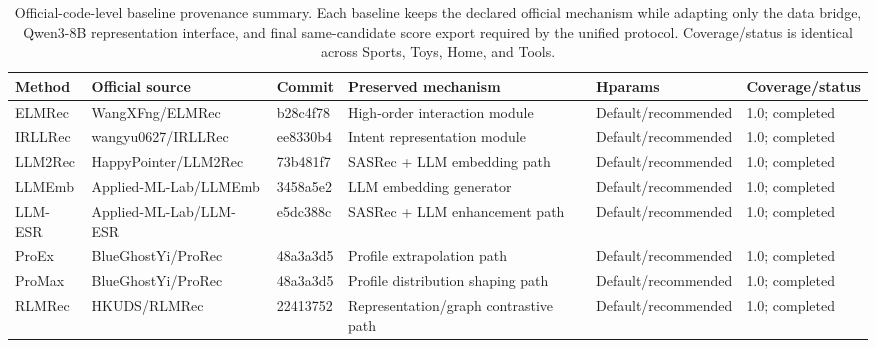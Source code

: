 \begin{table}[t]
\centering
\scriptsize
\setlength{\tabcolsep}{3pt}
\caption{Official-code-level baseline provenance summary. Each baseline keeps
the declared official mechanism while adapting only the data bridge, Qwen3-8B
representation interface, and final same-candidate score export required by
the unified protocol. Coverage/status is identical across Sports, Toys, Home,
and Tools.}
\label{tab:baseline_provenance}
\begin{tabular}{llllll}
\toprule
Method & Official source & Commit & Preserved mechanism & Hparams & Coverage/status \\
\midrule
ELMRec & WangXFng/ELMRec & b28c4f78 & High-order interaction module & Default/recommended & 1.0; completed \\
IRLLRec & wangyu0627/IRLLRec & ee8330b4 & Intent representation module & Default/recommended & 1.0; completed \\
LLM2Rec & HappyPointer/LLM2Rec & 73b481f7 & SASRec + LLM embedding path & Default/recommended & 1.0; completed \\
LLMEmb & Applied-ML-Lab/LLMEmb & 3458a5e2 & LLM embedding generator & Default/recommended & 1.0; completed \\
LLM-ESR & Applied-ML-Lab/LLM-ESR & e5dc388c & SASRec + LLM enhancement path & Default/recommended & 1.0; completed \\
ProEx & BlueGhostYi/ProRec & 48a3a3d5 & Profile extrapolation path & Default/recommended & 1.0; completed \\
ProMax & BlueGhostYi/ProRec & 48a3a3d5 & Profile distribution shaping path & Default/recommended & 1.0; completed \\
RLMRec & HKUDS/RLMRec & 22413752 & Representation/graph contrastive path & Default/recommended & 1.0; completed \\
\bottomrule
\end{tabular}
\end{table}
